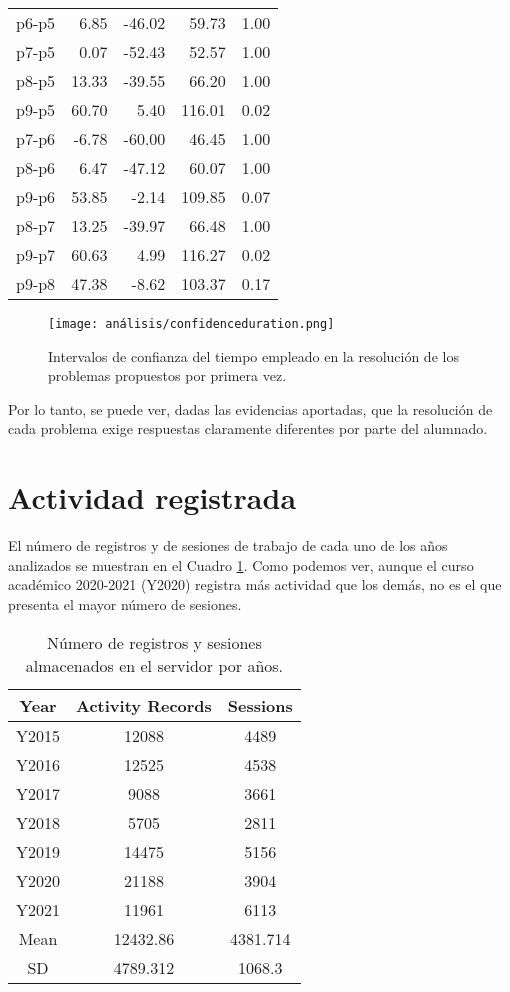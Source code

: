 \begin{table}[H]
\begin{tabular}{rrrrr}
  p6-p5 & 6.85 & -46.02 & 59.73 & 1.00 \\ 
  p7-p5 & 0.07 & -52.43 & 52.57 & 1.00 \\ 
  p8-p5 & 13.33 & -39.55 & 66.20 & 1.00 \\ 
  p9-p5 & 60.70 & 5.40 & 116.01 & 0.02 \\ 
  p7-p6 & -6.78 & -60.00 & 46.45 & 1.00 \\ 
  p8-p6 & 6.47 & -47.12 & 60.07 & 1.00 \\ 
  p9-p6 & 53.85 & -2.14 & 109.85 & 0.07 \\ 
  p8-p7 & 13.25 & -39.97 & 66.48 & 1.00 \\ 
  p9-p7 & 60.63 & 4.99 & 116.27 & 0.02 \\ 
  p9-p8 & 47.38 & -8.62 & 103.37 & 0.17 \\ 
   \hline
\end{tabular}
\end{table}

\begin{figure}[H]
    \centering
    \texttt{[image: análisis/confidenceduration.png]}
    \caption{Intervalos de confianza del tiempo empleado en la resolución de los problemas propuestos por primera vez.}
    \label{fig:confidenceduration}
\end{figure}

Por lo tanto, se puede ver, dadas las evidencias aportadas, que la resolución de cada problema exige respuestas claramente diferentes por parte del alumnado.

\section{Actividad registrada}\label{sec:activityrecorded}

El número de registros y de sesiones de trabajo de cada uno de los años analizados se muestran en el Cuadro \ref{tab:records}. Como podemos ver, aunque el curso académico 2020-2021 (Y2020) registra más actividad que los demás, no es el que presenta el mayor número de sesiones.

\begin{table}[H]
\centering
\caption{Número de registros y sesiones almacenados en el servidor por años.}
\label{tab:records}
\begin{tabular}{ccc}
\hline
\textbf{Year}  & \textbf{Activity Records} & \textbf{Sessions}  \\ \hline
Y2015 & 12088            &  4489  \\
Y2016 & 12525            &  4538  \\
Y2017 & 9088             &  3661  \\
Y2018 & 5705             &  2811  \\
Y2019 & 14475            &  5156  \\
Y2020 & 21188            &  3904  \\
Y2021 & 11961            &  6113  \\ \hline
Mean & 12432.86 & 4381.714 \\
SD & 4789.312 & 1068.3 \\ \hline
\end{tabular}
\end{table}

